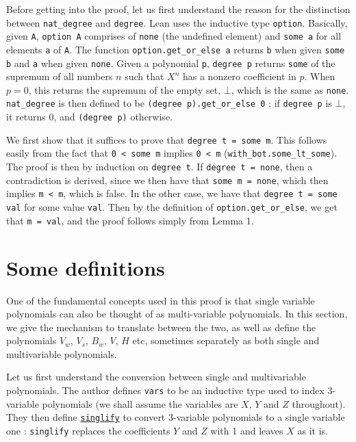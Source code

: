 \documentclass{article}
\theoremstyle{definition}
\theoremstyle{remark}
\begin{document}
Before getting into the proof, let us first understand the reason for the distinction between \texttt{nat\_degree} and \texttt{degree}. Lean uses the inductive type \texttt{option}. Basically, given \texttt{A}, 
\texttt{option A} comprises of \texttt{none} (the undefined element) and \texttt{some a} for all elements \texttt{a} of \texttt{A}. The function \texttt{option.get\_or\_else a} returns \texttt{b} when given 
\texttt{some b} and \texttt{a} when given \texttt{none}. Given a polynomial \texttt{p}, \texttt{degree p} returns \texttt{some} of the supremum of all numbers $n$ such that $X^n$ has 
a nonzero coefficient in $p$. When $p = 0$, this returns the supremum of the empty set, $\bot$, which is the same as \texttt{none}. \texttt{nat\_degree} is then defined to be \texttt{(degree p).get\_or\_else 0} : 
if \texttt{degree p} is $\bot$, it returns 0, and \texttt{(degree p)} otherwise.

We first show that it suffices to prove that \texttt{degree t = some m}. This follows easily from the fact that \texttt{0 < some m} implies \texttt{0 < m} (\texttt{with\_bot.some\_lt\_some}).
The proof is then by induction on \texttt{degree t}. 
If \texttt{degree t = none}, then a contradiction is derived, since we then have that \texttt{some m = none}, which then implies \texttt{m < m}, which is false. In the other case, we have that \texttt{degree t = some val} 
for some value \texttt{val}. Then by the definition of \texttt{option.get\_or\_else}, we get that \texttt{m = val}, and the proof follows simply from Lemma 1.

\section{Some definitions}
One of the fundamental concepts used in this proof is that single variable polynomials can also be thought of as multi-variable polynomials. In this section, we give the mechanism to translate between the two, as well as 
define the polynomials $V_w$, $V_s$, $B_w$, $V$, $H$ etc, sometimes separately as both single and multivariable polynomials. 

Let us first understand the conversion between single and multivariable polynomials. The author defines \texttt{vars} to be an inductive type used to index 3-variable polynomials (we shall assume the variables are $X$, $Y$ 
and $Z$ throughout). They then define \href{https://github.com/BoltonBailey/formal-snarks-project/blob/7fd9cd122f5887f88f6a706b4f2a68a7153c7381/src/snarks/babysnark/knowledge_soundness.lean#L139}{\texttt{singlify}} to 
convert 3-variable polynomials to a single variable one : \texttt{singlify} replaces the coefficients $Y$ and $Z$ with 1 and leaves $X$ as it is.
\end{document}
